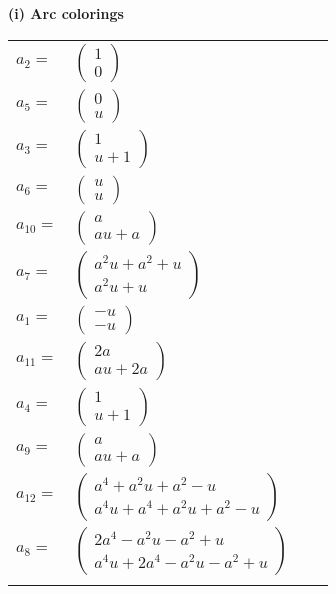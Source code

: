 \documentclass[1p]{elsarticle_modified}
\theoremstyle{definition}
\begin{document}
\flushleft \textbf{(i) Arc colorings}\\
\begin{tabular}{m{7pt} m{180pt} m{7pt} m{180pt} }
\flushright $a_{2}=$&$\begin{pmatrix}1\\0\end{pmatrix}$ \\
\flushright $a_{5}=$&$\begin{pmatrix}0\\u\end{pmatrix}$ \\
\flushright $a_{3}=$&$\begin{pmatrix}1\\u+1\end{pmatrix}$ \\
\flushright $a_{6}=$&$\begin{pmatrix}u\\u\end{pmatrix}$ \\
\flushright $a_{10}=$&$\begin{pmatrix}a\\a u+a\end{pmatrix}$ \\
\flushright $a_{7}=$&$\begin{pmatrix}a^2 u+a^2+u\\a^2 u+u\end{pmatrix}$ \\
\flushright $a_{1}=$&$\begin{pmatrix}- u\\- u\end{pmatrix}$ \\
\flushright $a_{11}=$&$\begin{pmatrix}2 a\\a u+2 a\end{pmatrix}$ \\
\flushright $a_{4}=$&$\begin{pmatrix}1\\u+1\end{pmatrix}$ \\
\flushright $a_{9}=$&$\begin{pmatrix}a\\a u+a\end{pmatrix}$ \\
\flushright $a_{12}=$&$\begin{pmatrix}a^4+a^2 u+a^2- u\\a^4 u+a^4+a^2 u+a^2- u\end{pmatrix}$ \\
\flushright $a_{8}=$&$\begin{pmatrix}2 a^4- a^2 u- a^2+u\\a^4 u+2 a^4- a^2 u- a^2+u\end{pmatrix}$\\&\end{tabular}
\end{document}

